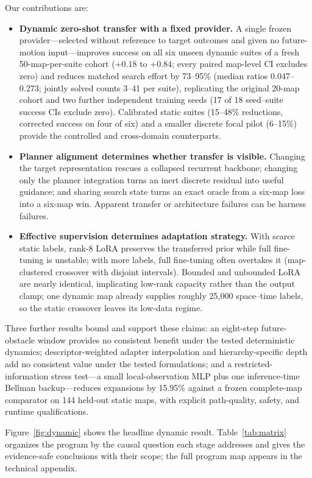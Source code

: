 \documentclass[letterpaper]{article} %
\begin{document}
Our contributions are:
\begin{itemize}
    \item \textbf{Dynamic zero-shot transfer with a fixed provider.} A single frozen provider---selected without reference to target outcomes and given no future-motion input---improves success on all six unseen dynamic suites of a fresh 50-map-per-suite cohort ($+0.18$ to $+0.84$; every paired map-level CI excludes zero) and reduces matched search effort by 73--95\% (median ratios 0.047--0.273; jointly solved counts 3--41 per suite), replicating the original 20-map cohort and two further independent training seeds (17 of 18 seed--suite success CIs exclude zero). Calibrated static suites (15--48\% reductions, corrected success on four of six) and a smaller discrete focal pilot (6--15\%) provide the controlled and cross-domain counterparts.
    \item \textbf{Planner alignment determines whether transfer is visible.} Changing the target representation rescues a collapsed recurrent backbone; changing only the planner integration turns an inert discrete residual into useful guidance; and sharing search state turns an exact oracle from a six-map loss into a six-map win. Apparent transfer or architecture failures can be harness failures.
    \item \textbf{Effective supervision determines adaptation strategy.} With scarce static labels, rank-8 LoRA preserves the transferred prior while full fine-tuning is unstable; with more labels, full fine-tuning often overtakes it (map-clustered crossover with disjoint intervals). Bounded and unbounded LoRA are nearly identical, implicating low-rank capacity rather than the output clamp; one dynamic map already supplies roughly 25{,}000 space--time labels, so the static crossover leaves its low-data regime.
\end{itemize}
Three further results bound and support these claims: an eight-step future-obstacle window provides no consistent benefit under the tested deterministic dynamics; descriptor-weighted adapter interpolation and hierarchy-specific depth add no consistent value under the tested formulations; and a restricted-information stress test---a small local-observation MLP plus one inference-time Bellman backup---reduces expansions by 15.95\% against a frozen complete-map comparator on 144 held-out static maps, with explicit path-quality, safety, and runtime qualifications.

Figure~\ref{fig:dynamic} shows the headline dynamic result. Table~\ref{tab:matrix} organizes the program by the causal question each stage addresses and gives the evidence-safe conclusions with their scope; the full program map appears in the technical appendix.
\end{document}
